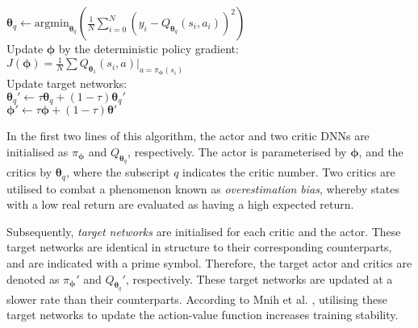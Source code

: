 \begin{algorithm}[hbt!]
{{        $\bm{\theta}_q \leftarrow \text{argmin}_{\bm{\theta}_q} ( \frac{1}{N} \sum_{i=0}^{N} (y_i - Q_{\bm{\theta}_q}(s_i,a_i))^{2} ) $ \\
        \vspace{0.5cm}
        {
            Update $\bm{\phi}$ by the deterministic policy gradient: \\ %
            \nonl $J(\bm{\phi}) = \frac{1}{N} \sum Q_{\bm{\theta}_1}(s_i,a) | _{a=\pi_{\bm{\phi}}(s_i)}$ \\
            Update target networks: \\
            $\bm{\theta}_{q}' \leftarrow \tau \bm{\theta}_q + (1 - \tau) \bm{\theta}_{q}'$ \\
            $\bm{\phi}' \leftarrow \tau \bm{\phi} + (1 - \tau) \bm{\theta}'$ \\
        }
    }
}
\end{algorithm}



In the first two lines of this algorithm, the actor and two critic DNNs are initialised as $\pi_{\bm{\phi}}$ and $Q_{\bm{\theta}_q}$, respectively.
The actor is parameterised by $\bm{\phi}$, and the critics by $\bm{\theta}_q$, where the subscript $q$ indicates the critic number.
Two critics are utilised to combat a phenomenon known as \emph{overestimation bias}, whereby states with a low real return are evaluated as having a high expected return. 


Subsequently, \emph{target networks} are initialised for each critic and the actor.
These target networks are identical in structure to their corresponding counterparts, and are indicated with a prime symbol.
Therefore, the target actor and critics are denoted as $\pi_{\bm{\phi}}'$ and $Q_{\bm{\theta}_q}'$, respectively.
These target networks are updated at a slower rate than their counterparts.
According to Mnih et al. \cite{mnih2013}, utilising these target networks to update the action-value function increases training stability.


